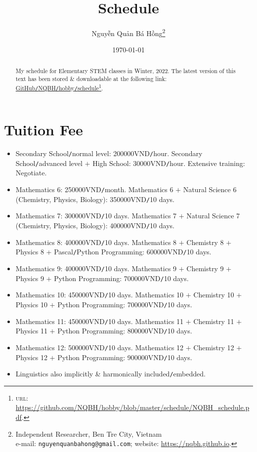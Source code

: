 \documentclass[landscape,a4paper]{article}
\title{Schedule}
\author{\selectlanguage{vietnamese} Nguyễn Quản Bá Hồng\footnote{Independent Researcher, Ben Tre City, Vietnam\\e-mail: \texttt{nguyenquanbahong@gmail.com}; website: \url{https://nqbh.github.io}.}}
\date{\today}
\begin{document}
\maketitle
\begin{abstract}
	My schedule for Elementary STEM classes in Winter, 2022. The latest version of this text has been stored \& downloadable at the following link: \href{https://github.com/NQBH/hobby/blob/master/schedule/NQBH_schedule.pdf}{GitHub\texttt{/}NQBH\texttt{/}hobby\texttt{/}schedule}\footnote{\textsc{url}: \url{https://github.com/NQBH/hobby/blob/master/schedule/NQBH_schedule.pdf}.}.
\end{abstract}

\section*{Tuition Fee}
\begin{itemize}
	\item Secondary School\texttt{/}normal level: 200000VND\texttt{/}hour. Secondary School\texttt{/}advanced level $+$ High School: 30000VND\texttt{/}hour. Extensive training: Negotiate.
	\item Mathematics 6: 250000VND\texttt{/}month. Mathematics 6 $+$ Natural Science 6 (Chemistry, Physics, Biology): 350000VND\texttt{/}10 days.
	\item Mathematics 7: 300000VND\texttt{/}10 days. Mathematics 7 $+$ Natural Science 7 (Chemistry, Physics, Biology): 400000VND\texttt{/}10 days.
	\item Mathematics 8: 400000VND\texttt{/}10 days. Mathematics 8 $+$ Chemistry 8 $+$ Physics $8$ + Pascal\texttt{/}Python Programming: 600000VND\texttt{/}10 days.
	\item Mathematics 9: 400000VND\texttt{/}10 days. Mathematics 9 $+$ Chemistry 9 $+$ Physics 9 $+$ Python Programming: 700000VND\texttt{/}10 days.
	\item Mathematics 10: 450000VND\texttt{/}10 days. Mathematics 10 $+$ Chemistry 10 $+$ Physics 10 $+$ Python Programming: 700000VND\texttt{/}10 days.
	\item Mathematics 11: 450000VND\texttt{/}10 days. Mathematics 11 $+$ Chemistry 11 $+$ Physics 11 $+$ Python Programming: 800000VND\texttt{/}10 days.
	\item Mathematics 12: 500000VND\texttt{/}10 days. Mathematics 12 $+$ Chemistry 12 $+$ Physics 12 $+$ Python Programming: 900000VND\texttt{/}10 days.
	\item Linguistics also implicitly \& harmonically included\texttt{/}embedded.
\end{itemize}
\end{document}
